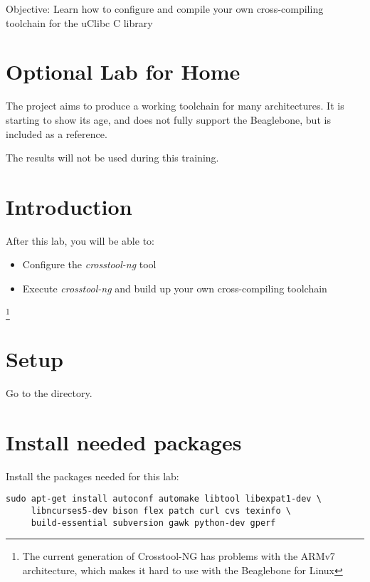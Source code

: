   {Objective: Learn how to configure and compile your own cross-compiling toolchain for the uClibc C
  library}

\section{Optional Lab for Home}

The  project aims to produce a working toolchain
for many architectures. It is starting to show its age, and does
not fully support the Beaglebone, but is included as a reference.

The results will not be used during this training.

\section{Introduction}

After this lab, you will be able to:

\begin{itemize}
\item Configure the {\em crosstool-ng} tool
\item Execute {\em crosstool-ng} and build up your own cross-compiling toolchain
\end{itemize}

\footnote{The current generation of Crosstool-NG has problems with the ARMv7 architecture, 
which makes it hard to use with the Beaglebone for Linux}

\section{Setup}

Go to the  directory.

\section{Install needed packages}

Install the packages needed for this lab:

\begin{verbatim}
sudo apt-get install autoconf automake libtool libexpat1-dev \
     libncurses5-dev bison flex patch curl cvs texinfo \
     build-essential subversion gawk python-dev gperf
\end{verbatim}

